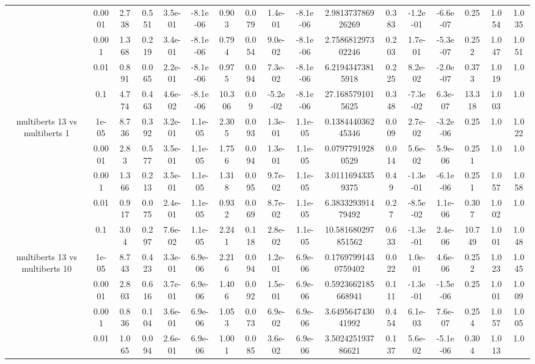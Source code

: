 \begin{tabular}{|c|c|c|c|c|c|c|c|c|c|c|c|c|c|c|c|c|}
 & 0.0001 & 2.738 & 0.551 & 3.5e-01 & -8.1e-06 & 0.903 & 0.079 & 1.4e-01 & -8.1e-06 & 2.981373786926269 & 0.383 & -1.2e-01 & -6.6e-07 & 0.25 & 1.054 & 1.035 \\
 & 0.001 & 1.368 & 0.219 & 3.4e-01 & -8.1e-06 & 0.794 & 0.054 & 9.0e-02 & -8.1e-06 & 2.758681297302246 & 0.203 & 1.7e-01 & -5.3e-07 & 0.252 & 1.047 & 1.051 \\
 & 0.01 & 0.891 & 0.065 & 2.2e-01 & -8.1e-06 & 0.975 & 0.094 & 7.3e-02 & -8.1e-06 & 6.21943473815918 & 0.225 & 8.2e-02 & -2.0e-07 & 0.373 & 1.019 & 1.0 \\
 & 0.1 & 4.774 & 0.463 & 4.6e-02 & -8.1e-06 & 10.306 & 0.09 & -5.2e-02 & -8.1e-06 & 27.1685791015625 & 0.348 & -7.3e-02 & 6.3e-07 & 13.318 & 1.003 & 1.0 \\
\hline
\multirow{5}{*}{multiberts 13 vs multiberts 1} & 1e-05 & 8.736 & 0.392 & 3.2e-01 & 1.1e-05 & 2.305 & 0.093 & 1.3e-01 & 1.1e-05 & 0.138444036245346 & 0.009 & 2.7e-02 & -3.2e-06 & 0.25 & 1.0 & 1.022 \\
 & 0.0001 & 2.83 & 0.577 & 3.5e-01 & 1.1e-05 & 1.756 & 0.094 & 1.3e-01 & 1.1e-05 & 0.07977919280529 & 0.014 & 5.6e-02 & 5.9e-06 & 0.251 & 1.0 & 1.0 \\
 & 0.001 & 1.366 & 0.213 & 3.5e-01 & 1.1e-05 & 1.318 & 0.095 & 9.7e-02 & 1.1e-05 & 3.01116943359375 & 0.49 & -1.3e-01 & -6.1e-06 & 0.251 & 1.057 & 1.058 \\
 & 0.01 & 0.917 & 0.075 & 2.4e-01 & 1.1e-05 & 0.932 & 0.069 & 8.7e-02 & 1.1e-05 & 6.383329391479492 & 0.27 & -8.5e-02 & 1.1e-06 & 0.307 & 1.002 & 1.0 \\
 & 0.1 & 3.04 & 0.297 & 7.6e-02 & 1.1e-05 & 2.241 & 0.118 & 2.8e-02 & 1.1e-05 & 10.581680297851562 & 0.633 & -1.3e-01 & 2.4e-06 & 10.749 & 1.001 & 1.048 \\
\hline
\multirow{5}{*}{multiberts 13 vs multiberts 10} & 1e-05 & 8.743 & 0.423 & 3.3e-01 & 6.9e-06 & 2.216 & 0.094 & 1.2e-01 & 6.9e-06 & 0.17697991430759402 & 0.022 & 1.0e-01 & 4.6e-06 & 0.252 & 1.023 & 1.045 \\
 & 0.0001 & 2.803 & 0.616 & 3.7e-01 & 6.9e-06 & 1.406 & 0.092 & 1.5e-01 & 6.9e-06 & 0.5923662185668941 & 0.111 & -1.3e-01 & -1.5e-06 & 0.25 & 1.001 & 1.009 \\
 & 0.001 & 0.836 & 0.104 & 3.6e-01 & 6.9e-06 & 1.053 & 0.073 & 6.9e-02 & 6.9e-06 & 3.649564743041992 & 0.454 & 6.1e-03 & 7.6e-07 & 0.254 & 1.057 & 1.005 \\
 & 0.01 & 1.065 & 0.094 & 2.6e-01 & 6.9e-06 & 1.001 & 0.085 & 3.6e-02 & 6.9e-06 & 3.502425193786621 & 0.137 & 5.6e-02 & -5.1e-06 & 0.304 & 1.013 & 1.0 \\

\end{tabular}
